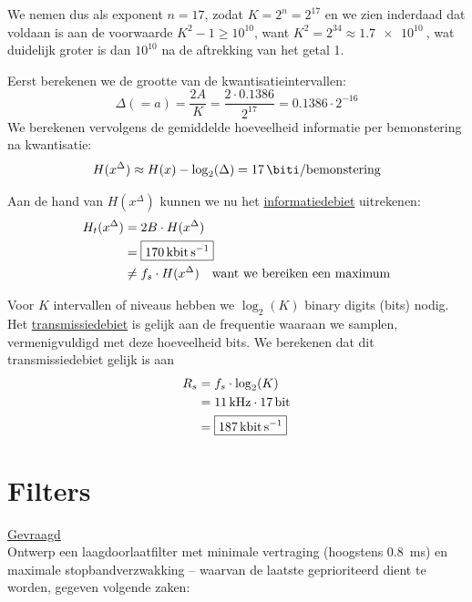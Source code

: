 \documentclass[kulak]{kulakarticle}
\begin{document}
\begin{enumerate}
\begin{itemize}
			We nemen dus als exponent \(n=17\), zodat \( K=2^n=2^{17} \) en we zien inderdaad dat voldaan is aan de voorwaarde \( K^2-1\geq 10^{10} \), want \( K^2=2^{34} \approx \SI{1.7e10}{} \), wat duidelijk groter is dan \(10^{10}\) na de aftrekking van het getal 1.

			 Eerst berekenen we de grootte van de kwantisatieintervallen: \[
			\Delta (=a) = \frac{2A}{K} = \dfrac{2\cdot 0.1386}{2^{17}} = 0.1386 \cdot 2^{-16}
			\]We berekenen vervolgens de gemiddelde hoeveelheid informatie per bemonstering na kwantisatie: \[
			H(x^{\Delta}) \approx H(x)-\log_2(\Delta) = \SI{17}{\biti \per bemonstering}
			\]

			Aan de hand van \( H(x^{\Delta}) \) kunnen we nu het \underline{informatiedebiet} uitrekenen: \begin{align*}
				H_{t}(x^{\Delta}) &= 2B \cdot H(x^{\Delta}) \\
				&= \boxed{\SI{170}{\kilo \bit \per \second}} \\
				&\neq f_s \cdot H(x^{\Delta}) \quad \text{want we bereiken een maximum}
			\end{align*}

			Voor \( K \) intervallen of niveaus hebben we \( \log_2(K) \) binary digits (bits) nodig. Het \underline{transmissiedebiet} is gelijk aan de frequentie waaraan we samplen, vermenigvuldigd met deze hoeveelheid bits. We berekenen dat dit transmissiedebiet gelijk is aan \begin{align*}
				R_s &= f_s \cdot \log_2(K) \\
				&= \SI{11}{\kilo\hertz} \cdot \SI{17}{\bit} \\
				&= \boxed{\SI{187}{\kilo\bit\per\second}}
			\end{align*}

		\end{itemize}


	\end{enumerate}

	\newpage
	\section{Filters}


	\underline{Gevraagd} \\

	Ontwerp een laagdoorlaatfilter met minimale vertraging (hoogstens \SI{0.8}{\milli\second}) en maximale stopbandverzwakking -- waarvan de laatste geprioriteerd dient te worden, gegeven volgende zaken:
\end{document}
